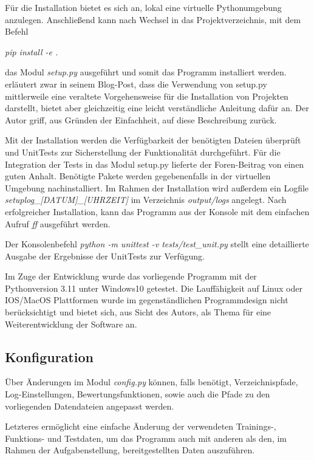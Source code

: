 Für die Installation bietet es sich an, lokal eine virtuelle Pythonumgebung anzulegen. Anschließend kann nach Wechsel in das Projektverzeichnis, mit dem Befehl
\begin{center}\emph{pip install -e .}\end{center}
das Modul \emph{setup.py} ausgeführt und somit das Programm installiert werden. \cite{geer_practical_2019} erläutert zwar in seinem Blog-Post, dass die Verwendung von setup.py mittlerweile eine veraltete Vorgehensweise für die Installation von Projekten darstellt, bietet aber gleichzeitig eine leicht verständliche Anleitung dafür an. Der Autor griff, aus Gründen der Einfachheit, auf diese Beschreibung zurück.  

Mit der Installation werden die Verfügbarkeit der benötigten Dateien überprüft und UnitTests zur Sicherstellung der Funktionalität durchgeführt. Für die Integration der Tests in das Modul setup.py lieferte der Foren-Beitrag von \cite{jesuisme_answer_2021} einen guten Anhalt. Benötigte Pakete werden gegebenenfalls in der virtuellen Umgebung nachinstalliert. Im Rahmen der Installation wird außerdem ein Logfile \emph{setuplog\_[DATUM]\_[UHRZEIT]} im Verzeichnis \emph{output/logs} angelegt. Nach erfolgreicher Installation, kann das Programm aus der Konsole mit dem einfachen Aufruf \emph{\glqq ff\grqq} ausgeführt werden.

Der Konsolenbefehl \emph{python -m unittest -v tests/test\_unit.py} stellt eine detaillierte Ausgabe der Ergebnisse der UnitTests zur Verfügung. 

Im Zuge der Entwicklung wurde das vorliegende Programm mit der Pythonversion 3.11 unter Windows10 getestet. Die Lauffähigkeit auf Linux oder IOS/MacOS Plattformen wurde im gegenständlichen Programmdesign nicht berücksichtigt und bietet sich, aus Sicht des Autors, als Thema für eine Weiterentwicklung der Software an.

\subsection{Konfiguration}

Über Änderungen im Modul \emph{config.py} können, falls benötigt, Verzeichnispfade, Log-Einstellungen, Bewertungsfunktionen, sowie auch die Pfade zu den vorliegenden Datendateien angepasst werden.

Letzteres ermöglicht eine einfache Änderung der verwendeten Trainings-, Funktions- und Testdaten, um das Programm auch mit anderen als den, im Rahmen der Aufgabenstellung, bereitgestellten Daten auszuführen.

